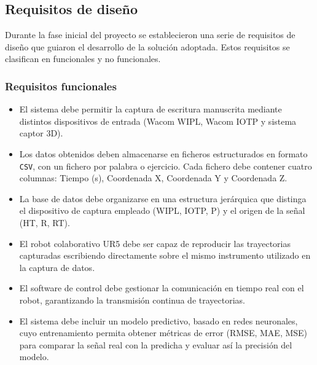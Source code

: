 \documentclass[12pt,a4paper,oneside]{report}
\begin{document}
\subsection{Requisitos de diseño}

Durante la fase inicial del proyecto se establecieron una serie 
de requisitos de diseño que guiaron el desarrollo de la solución 
adoptada. Estos requisitos se clasifican en funcionales y no 
funcionales.

\subsubsection*{Requisitos funcionales}
\begin{itemize}
  \item El sistema debe permitir la captura de escritura manuscrita 
        mediante distintos dispositivos de entrada (Wacom 
        \acrshort{WIPL}, Wacom \acrshort{IOTP} y sistema captor 3D).
  \item Los datos obtenidos deben almacenarse en ficheros 
        estructurados en formato \texttt{CSV}, con un fichero por 
        palabra o ejercicio. Cada fichero debe contener cuatro 
        columnas: Tiempo (s), Coordenada X, Coordenada Y y 
        Coordenada Z.
  \item La base de datos debe organizarse en una estructura jerárquica 
        que distinga el dispositivo de captura empleado 
        (\acrshort{WIPL}, \acrshort{IOTP}, P) y el origen de la señal 
        (HT, R, RT).
  \item El robot colaborativo \acrshort{UR5} debe ser capaz de 
        reproducir las trayectorias capturadas escribiendo 
        directamente sobre el mismo instrumento utilizado en la 
        captura de datos.
  \item El software de control debe gestionar la comunicación en 
        tiempo real con el robot, garantizando la transmisión 
        continua de trayectorias.
  \item El sistema debe incluir un modelo predictivo, basado en 
        redes neuronales, cuyo entrenamiento permita obtener métricas 
        de error (\acrshort{RMSE}, \acrshort{MAE}, \acrshort{MSE}) 
        para comparar la señal real con la predicha y evaluar así la 
        precisión del modelo.
\end{itemize}
\end{document}

